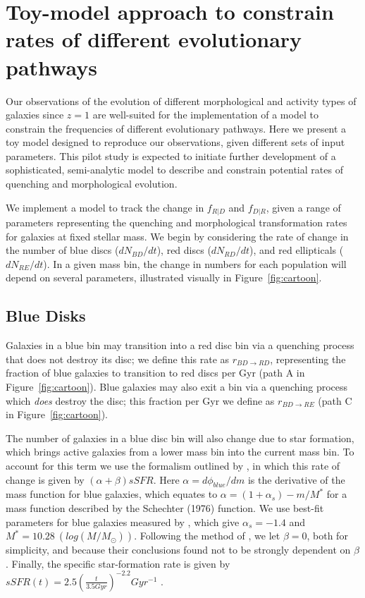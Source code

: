 \documentclass[useAMS,usenatbib]{mn2e}
\begin{document}

  


\newpage
\clearpage

\appendix

\section{Toy-model approach to constrain rates of different evolutionary pathways}
\label{appx:toymodel}

Our observations of the evolution of different morphological and activity types of galaxies since $z=1$ are well-suited for the implementation of a model to constrain the frequencies of different evolutionary pathways. Here we present a toy model designed to reproduce our observations, given different sets of input parameters. This pilot study is expected to initiate further development of a sophisticated, semi-analytic model to describe and constrain potential rates of quenching and morphological evolution. 

We implement a model to track the change in $f_{R|D}$ and $f_{D|R}$, given a range of parameters representing the quenching and morphological transformation rates for galaxies at fixed stellar mass. We begin by considering the rate of change in the number of blue discs ($dN_{BD}/dt$), red discs ($dN_{RD}/dt$), and red ellipticals ($dN_{RE}/dt$). In a given mass bin, the change in numbers for each population will depend on several parameters, illustrated visually in Figure~\ref{fig:cartoon}.

\subsection{Blue Disks}

Galaxies in a blue bin may transition into a red disc bin via a quenching process that does not destroy its disc; we define this rate as $r_{BD \rightarrow RD}$, representing the fraction of blue galaxies to transition to red discs per Gyr (path A in Figure~\ref{fig:cartoon}). Blue galaxies may also exit a bin via a quenching process which \emph{does} destroy the disc; this fraction per Gyr we define as $r_{BD \rightarrow RE}$ (path C in Figure~\ref{fig:cartoon}).

The number of galaxies in a blue disc bin will also change due to star formation, which brings active galaxies from a lower mass bin into the current mass bin. To account for this term we use the formalism outlined by \citet{Peng2010}, in which this rate of change is given by $(\alpha + \beta)sSFR$. Here $\alpha = d\phi_{blue}/dm$ is the derivative of the mass function for blue galaxies, which equates to $\alpha = (1+\alpha_s) - m/M^*$ for a mass function described by the Schechter (1976) function. We use best-fit parameters for blue galaxies measured by \citet{Ichikawa2017}, which give $\alpha_s = -1.4$ and $M^* = 10.28 ~(log(M/M_{\odot}))$. Following the method of \citet{Peng2010}, we let $\beta=0$, both for simplicity, and because their conclusions found not to be strongly dependent on $\beta$. Finally, the specific star-formation rate is given by $sSFR(t) = 2.5(\frac{t}{3.5 Gyr})^{-2.2}Gyr^{-1}$ \citep{Peng2010}.
\end{document}
